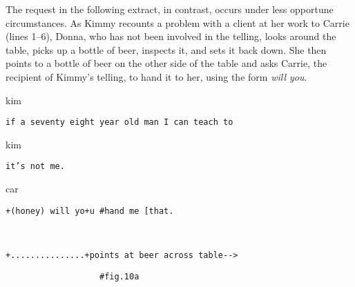 \documentclass[output=paper,nonflat,modfont,draft]{langsci/langscibook}
\begin{document}
The request in the following extract, in contrast, occurs under less opportune circumstances. As Kimmy recounts a problem with a client at her work to Carrie (lines 1--6), Donna, who has not been involved in the telling, looks around the table, picks up a bottle of beer, inspects it, and sets it back down. She then points to a bottle of beer on the other side of the table and asks Carrie, the recipient of Kimmy’s telling, to hand it to her, using the form \textit{will you}.


\begin{transbox}{1}{kim}
\begin{verbatim}
if a seventy eight year old man I can teach to
\end{verbatim}
\end{transbox}





\begin{transbox}{6}{kim}
\begin{verbatim}
it’s not me.
\end{verbatim}
\end{transbox}

\begin{mdframedkendrick}[style=firstfoc]
\begin{transbox}{7}{car}
\begin{verbatim}
+(honey) will yo+u #hand me [that.
\end{verbatim}
\end{transbox}
\end{mdframedkendrick}\vspace{-5mm}

\begin{transbox}{8}{~}
\begin{verbatim}
+...............+points at beer across table-->
\end{verbatim}
\end{transbox}

\begin{transbox}{9}{\fig}
\begin{verbatim}
                   #fig.10a
\end{verbatim}
\end{transbox}
\end{document}
